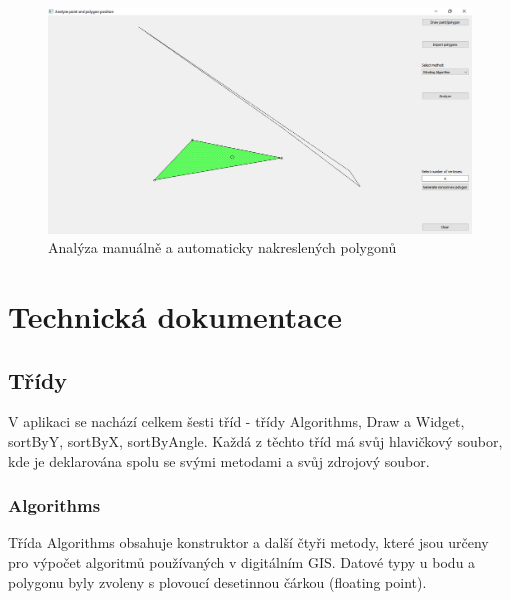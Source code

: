 \documentclass[a4paper,11pt,twoside]{article}
\begin{document}
\vspace{0.2cm}
\begin{figure}[hbt!] 
\begin{center}
\includegraphics[width=15cm]{pictures/manuallymadepolygon.png} 
\caption[Analýza manuálně a automaticky nakreslených polygonů]{Analýza manuálně a automaticky nakreslených polygonů}
\label{fig:manuallymadepolygon}
\end{center}
\end{figure}


\newpage
{}

\vspace*{-1cm}
\section{Technická dokumentace}
\subsection{Třídy}
V aplikaci se nachází celkem šesti tříd - třídy Algorithms, Draw a Widget, sortByY, sortByX, sortByAngle. Každá z těchto tříd má svůj hlavičkový soubor, kde je deklarována spolu se svými metodami a svůj zdrojový soubor.
\subsubsection{Algorithms}
Třída Algorithms obsahuje konstruktor a další čtyři metody, které jsou určeny pro výpočet algoritmů používaných v digitálním GIS. Datové typy u bodu a polygonu byly zvoleny s plovoucí desetinnou čárkou (floating point).\\
\end{document}
